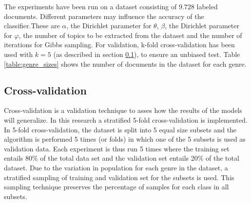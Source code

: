 
The experiments have been run on a dataset consisting of $9.728$ labeled documents. Different parameters may influence the accuracy of the classifier.These are $\alpha$, the Dirichlet parameter for $\theta$, $\beta$, the Dirichlet parameter for $\varphi$, the number of topics to be extracted from the dataset and the number of iterations for Gibbs sampling. 
For validation, k-fold cross-validation has been used with $k=5$ (as described in section \ref{sec:fold}), to ensure an unbiased test. Table \ref{table:genre_sizes} shows the number of documents in the dataset for each genre.

\begin{table}
\begin{center}
\caption{Number of documents per genre}
\label{table:genre_sizes}
\end{center}
\end{table}


\subsection{Cross-validation}\label{sec:fold}
Cross-validation is a validation technique to asses how the results of the models will generalize. In this research a stratified 5-fold cross-validation is implemented. In 5-fold cross-validation, the dataset is split into 5 equal size subsets and the algorithm is performed 5 times (or folds) in which one of the 5 subsets is used as validation data. Each experiment is thus run 5 times where the training set entails 80\% of the total data set and the validation set entails 20\% of the total dataset. Due to the variation in population for each genre in the dataset, a stratified sampling of training and validation set for the subsets is used. This sampling technique preserves the percentage of samples for each class in all subsets.


